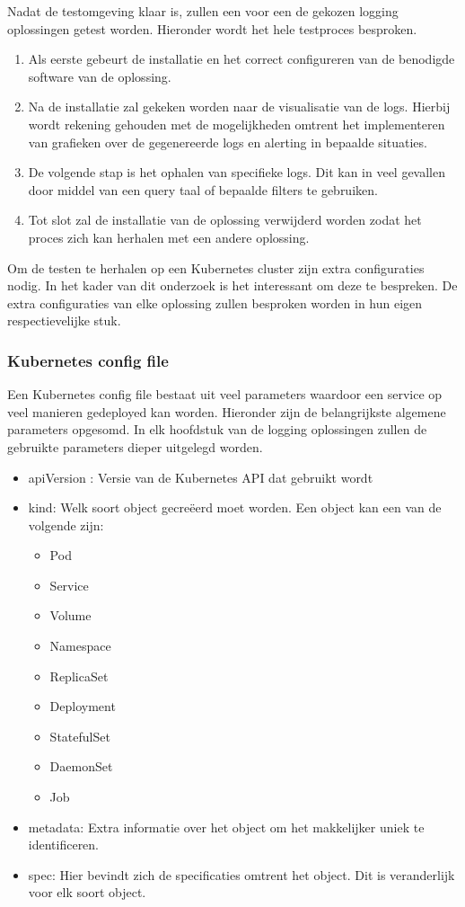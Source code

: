 Nadat de testomgeving klaar is, zullen een voor een de gekozen logging oplossingen getest worden. Hieronder wordt het hele testproces besproken.
\begin{enumerate}
    \item Als eerste gebeurt de installatie en het correct configureren van de benodigde software van de oplossing. 
    \item Na de installatie zal gekeken worden naar de visualisatie van de logs. Hierbij wordt rekening gehouden met de mogelijkheden omtrent het implementeren van grafieken over de gegenereerde logs en alerting in bepaalde situaties.
    \item De volgende stap is het ophalen van specifieke logs. Dit kan in veel gevallen door middel van een query taal of bepaalde filters te gebruiken.
    \item Tot slot zal de installatie van de oplossing verwijderd worden zodat het proces zich kan herhalen met een andere oplossing.
\end{enumerate}

Om de testen te herhalen op een Kubernetes cluster zijn extra configuraties nodig. In het kader van dit onderzoek is het interessant om deze te bespreken. De extra configuraties van elke oplossing zullen besproken worden in hun eigen respectievelijke stuk.

\subsubsection{Kubernetes config file}
Een Kubernetes config file bestaat uit veel parameters waardoor een service op veel manieren gedeployed kan worden. Hieronder zijn de belangrijkste algemene parameters opgesomd. In elk hoofdstuk van de logging oplossingen zullen de gebruikte parameters dieper uitgelegd worden.
\begin{itemize}
    \item apiVersion : Versie van de Kubernetes API dat gebruikt wordt
    \item kind: Welk soort object gecreëerd moet worden. Een object kan een van de volgende zijn: \begin{itemize}
        \item Pod
        \item Service
        \item Volume
        \item Namespace
        \item ReplicaSet
        \item Deployment
        \item StatefulSet
        \item DaemonSet
        \item Job
    \end{itemize}
    \item metadata: Extra informatie over het object om het makkelijker uniek te identificeren.
    \item spec: Hier bevindt zich de specificaties omtrent het object. Dit is veranderlijk voor elk soort object.
\end{itemize}

